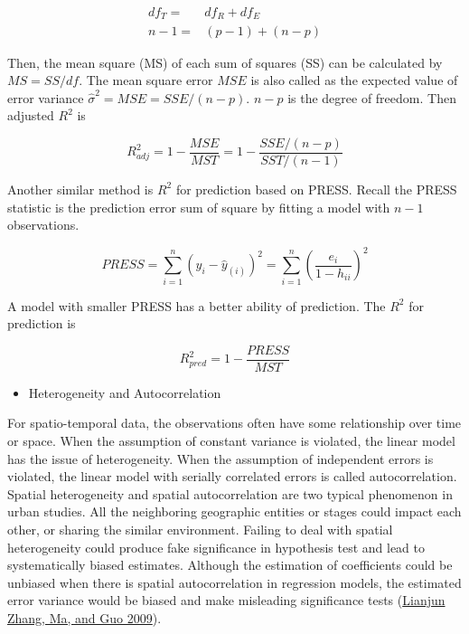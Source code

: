 \documentclass[
  11pt,
  openany]{memoir}
\providecommand{\tightlist}{%
  \setlength{\itemsep}{0pt}\setlength{\parskip}{0pt}}
\begin{document}
\begin{equation}
\begin{split}
df_T =& df_R + df_E\\
n-1=&(p-1)+(n-p)
\end{split}
\label{eq:df}
\end{equation}

Then, the mean square (MS) of each sum of squares (SS) can be calculated by \(MS=SS/df\). The mean square error \(MSE\) is also called as the expected value of error variance \(\hat\sigma^2=MSE=SSE/(n-p)\). \(n-p\) is the degree of freedom. Then adjusted \(R^2\) is

\begin{equation}
R_{adj}^2 = 1-\frac{MSE}{MST} = 1-\frac{SSE/(n-p)}{SST/(n-1)}
\label{eq:rsq-adj}
\end{equation}

Another similar method is \(R^2\) for prediction based on PRESS.
Recall the PRESS statistic is the prediction error sum of square by fitting a model with \(n-1\) observations.

\begin{equation}
PRESS = \sum_{i=1}^n(y_i-\hat y_{(i)})^2= \sum_{i=1}^n\left(\frac{e_i}{1-h_{ii}}\right)^2
\label{eq:press}
\end{equation}

A model with smaller PRESS has a better ability of prediction. The \(R^2\) for prediction is

\begin{equation}
R_{pred}^2 = 1-\frac{PRESS}{MST}
\label{eq:rsq-pred}
\end{equation}

\begin{itemize}
\tightlist
\item
  Heterogeneity and Autocorrelation
\end{itemize}

For spatio-temporal data, the observations often have some relationship over time or space.
When the assumption of constant variance is violated, the linear model has the issue of heterogeneity.
When the assumption of independent errors is violated, the linear model with serially correlated errors is called autocorrelation.
Spatial heterogeneity and spatial autocorrelation are two typical phenomenon in urban studies. All the neighboring geographic entities or stages could impact each other, or sharing the similar environment.
Failing to deal with spatial heterogeneity could produce fake significance in hypothesis test and lead to systematically biased estimates.
Although the estimation of coefficients could be unbiased when there is spatial autocorrelation in regression models, the estimated error variance would be biased and make misleading significance tests (\protect\hyperlink{ref-zhangEvaluationSpatialAutocorrelation2009}{Lianjun Zhang, Ma, and Guo 2009}).
\end{document}
